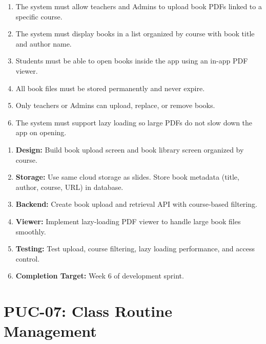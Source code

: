 \documentclass[12pt,a4paper]{article}
\begin{document}
\begin{tcolorbox}[frbox, title={Functional Requirements --- PUC-06}]
\begin{enumerate}[leftmargin=*, label=\textbf{FR-06.\arabic*}, itemsep=5pt]
  \item The system must allow teachers and Admins to upload book PDFs linked to a specific course.
  \item The system must display books in a list organized by course with book title and author name.
  \item Students must be able to open books inside the app using an in-app PDF viewer.
  \item All book files must be stored permanently and never expire.
  \item Only teachers or Admins can upload, replace, or remove books.
  \item The system must support lazy loading so large PDFs do not slow down the app on opening.
\end{enumerate}
\end{tcolorbox}

\begin{tcolorbox}[planbox, title={Completion Plan --- PUC-06}]
\begin{enumerate}[leftmargin=*, label=\textbf{Step \arabic*:}, itemsep=4pt]
  \item \textbf{Design:} Build book upload screen and book library screen organized by course.
  \item \textbf{Storage:} Use same cloud storage as slides. Store book metadata (title, author, course, URL) in database.
  \item \textbf{Backend:} Create book upload and retrieval API with course-based filtering.
  \item \textbf{Viewer:} Implement lazy-loading PDF viewer to handle large book files smoothly.
  \item \textbf{Testing:} Test upload, course filtering, lazy loading performance, and access control.
  \item \textbf{Completion Target:} Week 6 of development sprint.
\end{enumerate}
\end{tcolorbox}

\newpage
\section{PUC-07: Class Routine Management}
\end{document}
